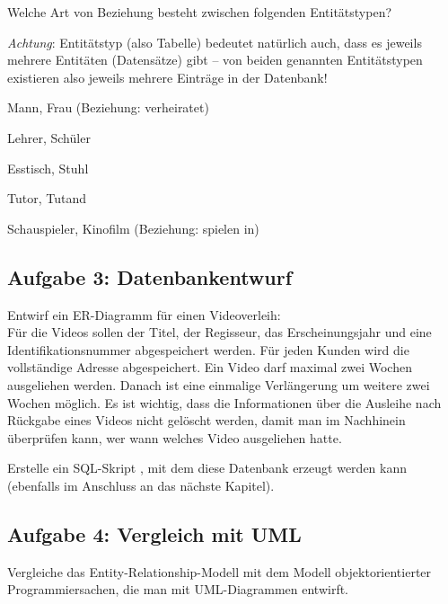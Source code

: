Welche Art von Beziehung besteht zwischen folgenden Entitätstypen? 

\emph{Achtung}: Entitätstyp (also Tabelle) bedeutet natürlich auch, dass es
jeweils mehrere Entitäten (Datensätze) gibt -- von beiden genannten
Entitätstypen existieren also jeweils mehrere Einträge in der Datenbank!

\begin{compactenum}[a)]
\item Mann, Frau (Beziehung: \glqq verheiratet\grqq )
\item Lehrer, Schüler
\item Esstisch, Stuhl
\item Tutor, Tutand
\item Schauspieler, Kinofilm (Beziehung: \glqq spielen in\grqq )
\end{compactenum}


\subsection{Aufgabe 3: Datenbankentwurf}

\begin{compactenum}[a)] 
\item Entwirf ein ER-Diagramm für einen Videoverleih:\\
Für die Videos sollen der Titel, der Regisseur, das Erscheinungsjahr und eine
Identifikationsnummer abgespeichert werden. Für jeden Kunden wird die
vollständige Adresse abgespeichert. Ein Video darf maximal zwei Wochen
ausgeliehen werden. Danach ist eine einmalige Verlängerung um weitere zwei
Wochen möglich. Es ist wichtig, dass die Informationen über die Ausleihe nach
Rückgabe eines Videos nicht gelöscht werden, damit man im Nachhinein überprüfen
kann, wer wann welches Video ausgeliehen hatte.
\item Erstelle ein SQL-Skript , mit dem diese
Datenbank erzeugt werden kann (ebenfalls im Anschluss an das nächste Kapitel).
\end{compactenum}

\pagebreak
 
\subsection{Aufgabe 4: Vergleich mit UML}

Vergleiche das Entity-Relationship-Modell mit dem Modell objektorientierter
Programmiersachen, die man mit UML-Diagrammen entwirft.



